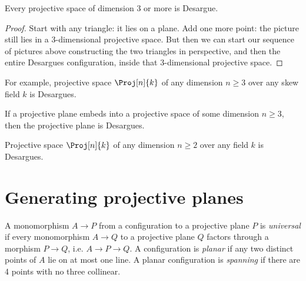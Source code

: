 \begin{theorem}
Every projective space of dimension 3 or more is Desargue.
\end{theorem}
\begin{proof}
Start with any triangle: it lies on a plane.
Add one more point: the picture still lies in a 3-dimensional projective space.
But then we can start our sequence of pictures above constructing the two triangles in perspective, and then the entire Desargues configuration, inside that 3-dimensional projective space.
\end{proof}

For example, projective space \(\Proj[n]{k}\) of any dimension \(n \ge 3\) over any skew field \(k\) is Desargues.

 
\begin{corollary}
If a projective plane embeds into a projective space of some dimension \(n \ge 3\), then the projective plane is Desargues.
\end{corollary}
 
\begin{example}
Projective space \(\Proj[n]{k}\) of any dimension \(n \ge 2\) over any field \(k\) is Desargues.
\end{example}

\section{Generating projective planes}
A monomorphism \(A \to P\) from a configuration to a projective plane \(P\) is \emph{universal} if every monomorphism \(A \to Q\) to a projective plane \(Q\) factors through a morphism \(P \to Q\), i.e. \(A \to P \to Q\).
A configuration is \emph{planar} if any two distinct points of \(A\) lie on at most one line.
A planar configuration is \emph{spanning} if there are 4 points with no three collinear.

